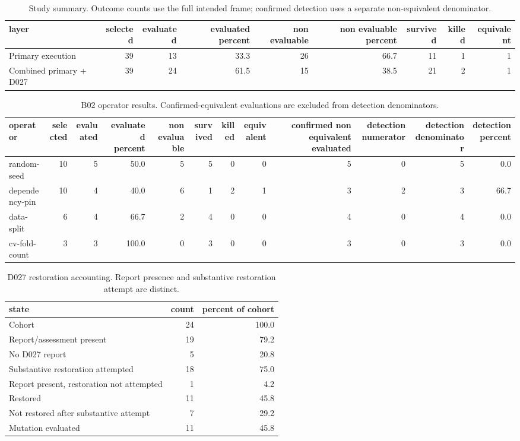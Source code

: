 \begin{table}[ht]
\centering
\caption{Study summary. Outcome counts use the full intended frame; confirmed detection uses a separate non-equivalent denominator.}
\begin{tabular}{lrrrrrrrr}
\hline
layer & selected & evaluated & evaluated percent & non evaluable & non evaluable percent & survived & killed & equivalent \\
\hline
Primary execution & 39 & 13 & 33.3 & 26 & 66.7 & 11 & 1 & 1 \\
Combined primary + D027 & 39 & 24 & 61.5 & 15 & 38.5 & 21 & 2 & 1 \\
\hline
\end{tabular}
\end{table}

\begin{table}[ht]
\centering
\caption{B02 operator results. Confirmed-equivalent evaluations are excluded from detection denominators.}
\begin{tabular}{lrrrrrrrrrrr}
\hline
operator & selected & evaluated & evaluated percent & non evaluable & survived & killed & equivalent & confirmed non equivalent evaluated & detection numerator & detection denominator & detection percent \\
\hline
random-seed & 10 & 5 & 50.0 & 5 & 5 & 0 & 0 & 5 & 0 & 5 & 0.0 \\
dependency-pin & 10 & 4 & 40.0 & 6 & 1 & 2 & 1 & 3 & 2 & 3 & 66.7 \\
data-split & 6 & 4 & 66.7 & 2 & 4 & 0 & 0 & 4 & 0 & 4 & 0.0 \\
cv-fold-count & 3 & 3 & 100.0 & 0 & 3 & 0 & 0 & 3 & 0 & 3 & 0.0 \\
\hline
\end{tabular}
\end{table}

\begin{table}[ht]
\centering
\caption{D027 restoration accounting. Report presence and substantive restoration attempt are distinct.}
\begin{tabular}{lrr}
\hline
state & count & percent of cohort \\
\hline
Cohort & 24 & 100.0 \\
Report/assessment present & 19 & 79.2 \\
No D027 report & 5 & 20.8 \\
Substantive restoration attempted & 18 & 75.0 \\
Report present, restoration not attempted & 1 & 4.2 \\
Restored & 11 & 45.8 \\
Not restored after substantive attempt & 7 & 29.2 \\
Mutation evaluated & 11 & 45.8 \\
\hline
\end{tabular}
\end{table}
